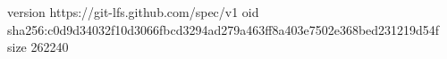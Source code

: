 version https://git-lfs.github.com/spec/v1
oid sha256:c0d9d34032f10d3066fbcd3294ad279a463ff8a403e7502e368bed231219d54f
size 262240
